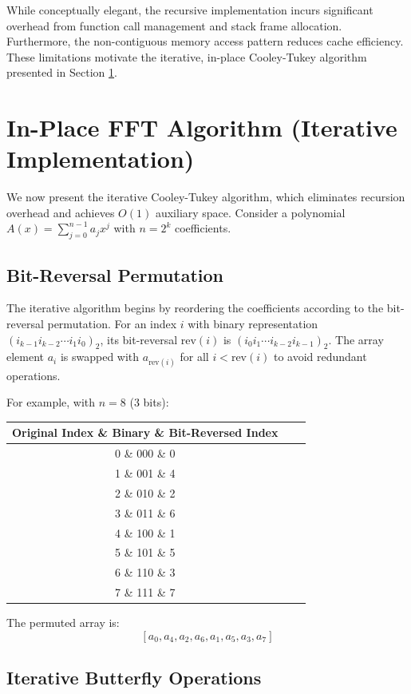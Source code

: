 \documentclass[a4paper]{article}
\theoremstyle{definition}
\begin{document}
While conceptually elegant, the recursive implementation incurs significant overhead from function call management and stack frame allocation. Furthermore, the non-contiguous memory access pattern reduces cache efficiency. These limitations motivate the iterative, in-place Cooley-Tukey algorithm presented in Section \ref{sec:inplace}.

\section{In-Place FFT Algorithm (Iterative Implementation)}\label{sec:inplace}

We now present the iterative Cooley-Tukey algorithm, which eliminates recursion overhead and achieves $O(1)$ auxiliary space. Consider a polynomial $A(x) = \sum_{j=0}^{n-1} a_j x^j$ with $n = 2^k$ coefficients.

\subsection{Bit-Reversal Permutation}

The iterative algorithm begins by reordering the coefficients according to the bit-reversal permutation. For an index $i$ with binary representation $(i_{k-1} i_{k-2} \cdots i_1 i_0)_2$, its bit-reversal $\text{rev}(i)$ is $(i_0 i_1 \cdots i_{k-2} i_{k-1})_2$. The array element $a_i$ is swapped with $a_{\text{rev}(i)}$ for all $i < \text{rev}(i)$ to avoid redundant operations.

For example, with $n=8$ (3 bits):
\begin{center}
\begin{tabular}{c|c|c}
Original Index \& Binary \& Bit-Reversed Index \\
\hline
0 \& 000 \& 0 \\
1 \& 001 \& 4 \\
2 \& 010 \& 2 \\
3 \& 011 \& 6 \\
4 \& 100 \& 1 \\
5 \& 101 \& 5 \\
6 \& 110 \& 3 \\
7 \& 111 \& 7 \\
\end{tabular}
\end{center}

The permuted array is:
$$[a_0, a_4, a_2, a_6, a_1, a_5, a_3, a_7]$$

\subsection{Iterative Butterfly Operations}
\end{document}
